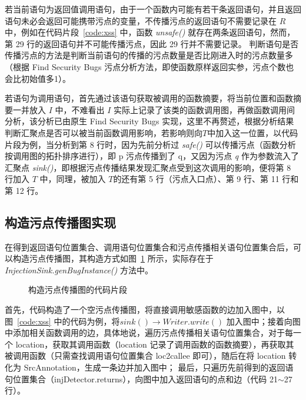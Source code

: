 若当前语句为返回值调用语句，由于一个函数内可能有若干条返回语句，并且返回语句未必会返回可能携带污点的变量，不传播污点的返回语句不需要记录在 $R$ 中，例如在代码片段~\ref{code:xss} 中，函数 \textit{unsafe()} 就存在两条返回语句，然而，第 29 行的返回语句并不可能传播污点，因此 29 行并不需要记录。 判断语句是否传播污点的方法是判断当前语句的传播的污点数量是否比刚进入时的污点数量多（根据 Find Security Bugs 污点分析方法，即使函数原样返回实参，污点个数也会比初始值多1）。

若语句为调用语句，首先通过该语句获取被调用的函数摘要，将当前位置和函数摘要一并放入 $I$ 中，不难看出 $I$ 实际上记录了该类的函数调用图，再做函数调用间分析，该分析已由原生 Find Security Bugs 实现，这里不再赘述，根据分析结果判断汇聚点是否可以被当前函数调用影响，若影响则向$T$中加入这一位置，以代码片段为例，当分析到第 8 行时，因为先前分析过 \textit{safe()} 可以传播污点（函数分析按调用图的拓扑排序进行），即 p 污点传播到了 q，又因为污点 \textit{q} 作为参数流入了汇聚点 \textit{sink()}，即根据污点传播结果发现汇聚点受到这次调用的影响，便将第 8 行加入 $T$ 中，同理，被加入 $T$的还有第 5 行（污点入口点）、第 9 行、第 11 行和第 12 行。

\subsection{构造污点传播图实现}
在得到返回语句位置集合、调用语句位置集合和污点传播相关语句位置集合后，可以构造污点传播图，其构造方式如图~\ref{code:taintGraph} 所示，实际存在于 \textit{InjectionSink.genBugInstance()} 方法中。

\begin{figure}[!htbp]
    \centering
    \begin{minipage}[!htbp]{0.9\textwidth}
        
    \end{minipage}
    \caption{构造污点传播图的代码片段}\label{code:taintGraph}
\end{figure}

首先，代码构造了一个空污点传播图，将直接调用敏感函数的边加入图中，以图~\ref{code:xss} 中的代码为例，将$sink() \rightarrow Writer.write()$ 加入图中；接着向图中添加相关函数调用的边，具体地说，遍历污点传播相关语句位置集合，对于每一个 location，获取其调用函数（location 记录了调用函数的函数摘要），再获取其被调用函数（只需查找调用语句位置集合 loc2callee 即可），随后在将 location 转化为 SrcAnnotation，生成一条边并加入图中； 最后，只遍历先前得到的返回语句位置集合（injDetector.returns），向图中加入返回语句的点和边（代码 21$\sim$27 行）。

